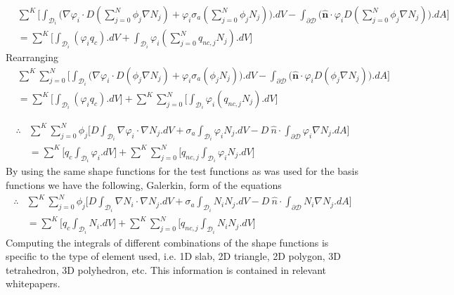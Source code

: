 \documentclass[11pt,letterpaper,titlepage]{article}
\newcommand{\bOmega}{\mathcal{D}}
\numberwithin{equation}{section}
\begin{document}
\begin{equation*}
\begin{aligned}
&\sum^K \biggr[
\int_{\bOmega_i} \biggr(
\nabla \varphi_i\cdot D (\sum_{j=0}^N \phi_j \nabla N_j)
+
\varphi_i\sigma_a  (\sum_{j=0}^N \phi_j N_j)
\biggr).dV
-
\int_{\partial \bOmega}\biggr( 
\mathbf{\hat{n}}\cdot \varphi_i D (\sum_{j=0}^N \phi_j \nabla N_j) 
\biggr). dA \biggr]
\\
&=\sum^K \biggr[
 \int_{\bOmega_i} (\varphi_i q_c).dV
 +
  \int_{\bOmega_i} \varphi_i (\sum_{j=0}^N q_{nc,j} N_j).dV 
  \biggr]
\end{aligned}
\end{equation*}
Rearranging
\begin{equation*}
\begin{aligned}
&\sum^K
\sum_{j=0}^N
 \biggr[
\int_{\bOmega_i} \biggr(
\nabla \varphi_i\cdot D ( \phi_j \nabla N_j)
+
\varphi_i\sigma_a  ( \phi_j N_j)
\biggr).dV
-
\int_{\partial \bOmega}\biggr( 
\mathbf{\hat{n}}\cdot \varphi_i D ( \phi_j \nabla N_j) 
\biggr). dA \biggr]
\\
&=\sum^K 
\biggr[
 \int_{\bOmega_i} (\varphi_i q_c).dV
\biggr]
 +
 \sum^K
 \sum_{j=0}^N
 \biggr[
  \int_{\bOmega_i} \varphi_i ( q_{nc,j} N_j).dV 
  \biggr]
\end{aligned}
\end{equation*}

\begin{equation*}
\begin{aligned}
\therefore
&\sum^K
\sum_{j=0}^N \phi_j
 \biggr[ 
D \int_{\bOmega_i} 
\nabla \varphi_i \cdot  \nabla N_j.dV
+
\sigma_a \int_{\bOmega_i}  \varphi_i N_j
.dV
-
D \ \hat{n} \cdot \int_{\partial \bOmega}
 \varphi_i \nabla N_j
. dA \biggr]
\\
&=\sum^K 
\biggr[q_c
 \int_{\bOmega_i} \varphi_i .dV 
 \biggr]
 +
 \sum^K
 \sum_{j=0}^N 
 \biggr[q_{nc,j}
  \int_{\bOmega_i} \varphi_i  N_j.dV 
  \biggr]
\end{aligned}
\end{equation*}
\newline
By using the same shape functions for the test functions as was used for the basis functions we have the following, Galerkin, form of the equations
\begin{equation}
\begin{aligned}
\therefore
&\sum^K
\sum_{j=0}^N \phi_j
 \biggr[ 
D \int_{\bOmega_i} 
\nabla N_i \cdot  \nabla N_j.dV
+
\sigma_a \int_{\bOmega_i}  N_i N_j
.dV
-
D \ \hat{n} \cdot \int_{\partial \bOmega}
 N_i \nabla N_j
. dA \biggr]
\\
&=\sum^K 
\biggr[q_c
 \int_{\bOmega_i} N_i .dV 
 \biggr]
 +
 \sum^K
 \sum_{j=0}^N 
 \biggr[q_{nc,j}
  \int_{\bOmega_i} N_i  N_j.dV 
  \biggr]
\end{aligned}
\end{equation}
\newline
Computing the integrals of different combinations of the shape functions is specific to the type of element used, i.e. 1D slab, 2D triangle, 2D polygon, 3D tetrahedron, 3D polyhedron, etc. This information is contained in relevant whitepapers.
\end{document}
